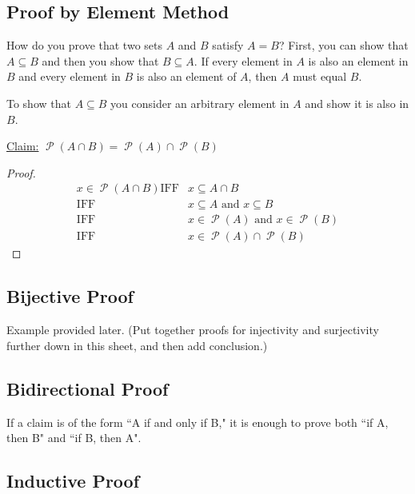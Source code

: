 \documentclass[12pt,letterpaper]{article}
\newcommand{\claim}{\underline{Claim:} }
\newcommand\Pow{\ensuremath{\operatorname{\mathcal{P}}}}
\begin{document}
    \subsection{Proof by Element Method}
    
    How do you prove that two sets $A$ and $B$ satisfy $A = B$? First, you can show that $A \subseteq B$ and then you show that $B \subseteq A$. If every element in $A$ is also an element in $B$ and every element in $B$ is also an element of $A$, then $A$ must equal $B$. 

    To show that $A \subseteq B$ you consider an arbitrary element in $A$ and show it is also in $B$. 

\renewcommand{\iff}{\textrm{IFF}}

        \begin{mdframed}
        \claim $\Pow{(A\cap B)} = \Pow{(A)}\cap \Pow{(B)}$
        \begin{proof}
        \begin{align*}
        x \in \Pow{(A\cap B)}
        \iff & x \subseteq A \cap B \\
        \iff & x \subseteq A \text{ and } x \subseteq B \\
        \iff & x \in \Pow{(A)} \text{ and } x \in \Pow{(B)} \\
        \iff & x \in \Pow{(A)}\cap \Pow{(B)}
        \end{align*}
        \end{proof}     
        \end{mdframed}
    
    \subsection{Bijective Proof}
    
    Example provided later. (Put together proofs for injectivity and surjectivity further down in this sheet, and then add conclusion.)
    
    \subsection{Bidirectional Proof}
    
    If a claim is of the form ``A if and only if B," it is enough to prove both ``if A, then B" and ``if B, then A".
    
    \subsection{Inductive Proof}
    
\end{document}
